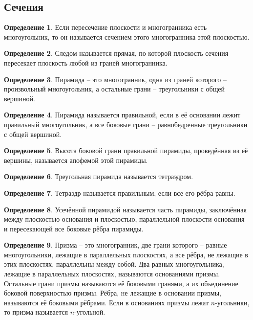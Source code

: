 \documentclass[12pt]{article}
\theoremstyle{definition}
\newtheorem{definition}{Определение}
\begin{document}
    \subsection{Сечения}

    \begin{definition}
        Если пересечение плоскости и многогранника есть многоугольник, то он называется сечением этого многогранника этой плоскостью.
    \end{definition}
    \begin{definition}
        Следом называется прямая, по которой плоскость сечения пересекает плоскость любой из граней многогранника.
    \end{definition}
    \begin{definition}
        Пирамида – это многогранник, одна из граней которого – произвольный многоугольник, а остальные грани – треугольники с общей вершиной.
    \end{definition}
    \begin{definition}
        Пирамида называется правильной, если в её основании лежит правильный многоугольник, а все боковые грани – равнобедренные треугольники с общей вершиной.
    \end{definition}
    \begin{definition}
        Высота боковой грани правильной пирамиды, проведённая из её вершины, называется апофемой этой пирамиды.
    \end{definition}
    \begin{definition}
        Треугольная пирамида называется тетраэдром.
    \end{definition}
    \begin{definition}
        Тетраэдр называется правильным, если все его рёбра равны.
    \end{definition}
    \begin{definition}
        Усечённой пирамидой называется часть пирамиды, заключённая между плоскостью основания и плоскостью, параллельной плоскости основания и пересекающей все боковые рёбра пирамиды.
    \end{definition}
    \begin{definition}
        Призма – это многогранник, две грани которого – равные многоугольники, лежащие в параллельных плоскостях, а все рёбра, не лежащие в этих плоскостях, параллельны между собой. Два равных многоугольника, лежащие в параллельных плоскостях, называются основаниями призмы. Остальные грани призмы называются её боковыми гранями, а их объединение \textendash\, боковой поверхностью призмы. Рёбра, не лежащие в основании призмы, называются её боковыми рёбрами. Если в основаниях призмы лежат $n$-угольники, то призма называется $n$-угольной.
    \end{definition}
\end{document}
